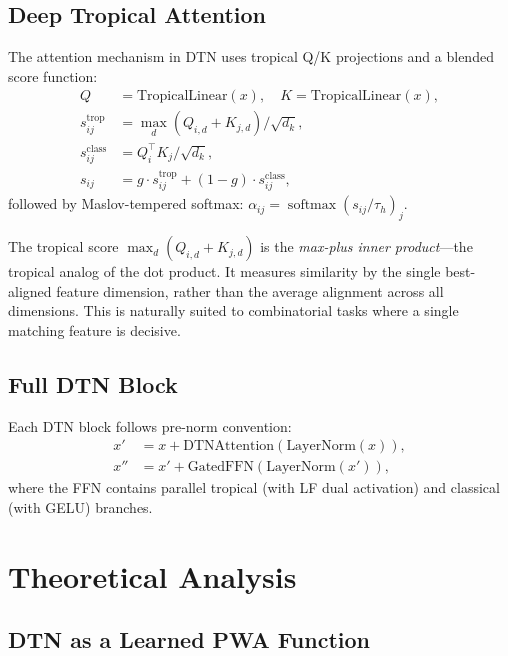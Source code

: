 \documentclass[11pt,twocolumn]{article}
\newcommand{\softmax}{\operatorname{softmax}}
\begin{document}
\subsection{Deep Tropical Attention}

The attention mechanism in DTN uses tropical Q/K projections and a blended
score function:
\begin{align}
  Q &= \text{TropicalLinear}(x), \quad K = \text{TropicalLinear}(x), \\
  s^\text{trop}_{ij} &= \max_d(Q_{i,d} + K_{j,d}) / \sqrt{d_k}, \\
  s^\text{class}_{ij} &= Q_i^\top K_j / \sqrt{d_k}, \\
  s_{ij} &= g \cdot s^\text{trop}_{ij} + (1-g) \cdot s^\text{class}_{ij},
\end{align}
followed by Maslov-tempered softmax:
$\alpha_{ij} = \softmax(s_{ij} / \tau_h)_j$.

The tropical score $\max_d(Q_{i,d} + K_{j,d})$ is the \emph{max-plus inner
product}---the tropical analog of the dot product. It measures similarity by
the single best-aligned feature dimension, rather than the average alignment
across all dimensions. This is naturally suited to combinatorial tasks where
a single matching feature is decisive.

\subsection{Full DTN Block}

Each DTN block follows pre-norm convention:
\begin{align}
  x' &= x + \text{DTNAttention}(\text{LayerNorm}(x)), \\
  x'' &= x' + \text{GatedFFN}(\text{LayerNorm}(x')),
\end{align}
where the FFN contains parallel tropical (with LF dual activation) and
classical (with GELU) branches.

\section{Theoretical Analysis}\label{sec:theory}

\subsection{DTN as a Learned PWA Function}
\end{document}
